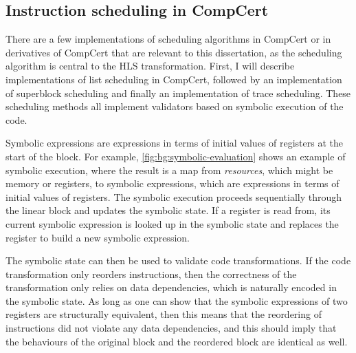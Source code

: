 \subsection{Instruction scheduling in CompCert}%
\label{sec:bg:instruction-scheduling-compcert}

There are a few implementations of scheduling algorithms in CompCert or in
derivatives of CompCert that are relevant to this dissertation, as the
scheduling algorithm is central to the \gls{HLS} transformation.  First, I will
describe implementations of list scheduling in CompCert, followed by an
implementation of superblock scheduling and finally an implementation of trace
scheduling.  These scheduling methods all implement validators based on symbolic
execution of the code.

Symbolic expressions are expressions in terms of initial values of registers at
the start of the block.  For example, \cref{fig:bg:symbolic-evaluation} shows an
example of symbolic execution, where the result is a map from \emph{resources},
which might be memory or registers, to symbolic expressions, which are
expressions in terms of initial values of registers.  The symbolic execution
proceeds sequentially through the linear block and updates the symbolic state.
If a register is read from, its current symbolic expression is looked up in the
symbolic state and replaces the register to build a new symbolic expression.

The symbolic state can then be used to validate code transformations.  If the
code transformation only reorders instructions, then the correctness of the
transformation only relies on data dependencies, which is naturally encoded in
the symbolic state.  As long as one can show that the symbolic expressions of
two registers are structurally equivalent, then this means that the reordering
of instructions did not violate any data dependencies, and this should imply
that the behaviours of the original block and the reordered block are identical
as well.

